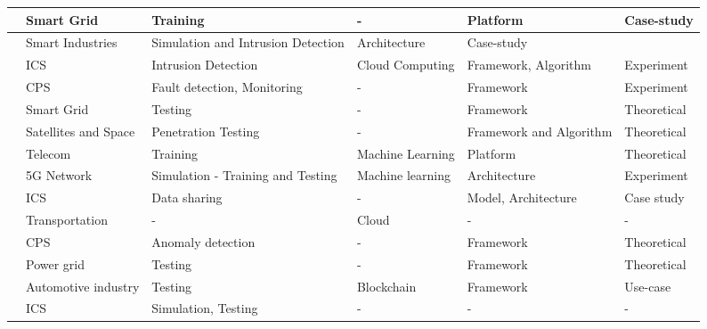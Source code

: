 \begin{table}[H]
\begin{NiceTabular}{p{0.5cm}|p{3cm}|p{2.5cm}|p{2cm}|p{3cm}|p{1.5cm}}
    \cite{kandasamyElectricPowerDigital2022} & Smart Grid & Training & - & Platform & Case-study \\
    \hline

    \cite{hussainiTaxonomySecurityDefense2022} & Smart Industries & Simulation and Intrusion Detection & Architecture & Case-study \\
    \hline

    \cite{akbarianSecurityFrameworkDigital2021} & ICS & Intrusion Detection & Cloud Computing & Framework, Algorithm & Experiment \\
    \hline

    \cite{xuGametheoreticApproachSecure2020} & CPS & Fault detection, Monitoring & - & Framework & Experiment \\
    \hline

    \cite{atalayDigitalTwinsApproach2020} & Smart Grid & Testing & - & Framework & Theoretical \\
    \hline

    \cite{houDigitalTwinRuntime2022} & Satellites and Space & Penetration Testing & - & Framework and Algorithm & Theoretical \\
    \hline

    \cite{vakarukDigitalTwinNetwork2021} & Telecom & Training & Machine Learning & Platform & Theoretical \\
    \hline

    \cite{rebecchiDigitalTwin5G2022} & 5G Network & Simulation - Training and Testing & Machine learning & Architecture & Experiment \\
    \hline

    \cite{gehrmannDigitalTwinBased2020} & ICS &  Data sharing & - & Model, Architecture & Case study \\
    \hline

    \cite{chengzhelaiSPDTSecurePrivacyPreserving2022} & Transportation & - & Cloud & - & - \\
    \hline

    \cite{alessandradebenedictischristiancarmineespositoalessandrasommaAdoptionSecureCyber2022} & CPS & Anomaly detection & - & Framework & Theoretical \\
    \hline

    \cite{olivares-rojasCybersecuritySmartGrid2022} & Power grid & Testing & - & Framework & Theoretical \\
    \hline

    \cite{suhailSituationalAwareCyberphysical2022} & Automotive industry & Testing & Blockchain & Framework & Use-case \\
    \hline

    \cite{dietzUnleashingDigitalTwin2020} &  ICS & Simulation, Testing & - & - & - \\
    \hline
\bottomrule
\end{NiceTabular}
\end{table}










